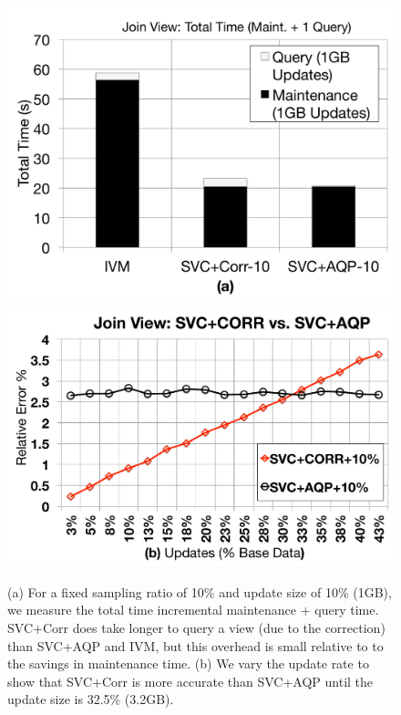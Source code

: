 \begin{figure}[t]
\centering
 \includegraphics[scale=0.13]{exp/msj_4.pdf}
 \includegraphics[scale=0.13]{exp/msj_6.pdf}
  \caption{(a) For a fixed sampling ratio of 10\% and update size of 10\% (1GB), we measure the total time incremental maintenance + query time. SVC+Corr does take longer to query a view (due to the correction) than SVC+AQP and IVM, but this overhead is small relative to to the savings in maintenance time. (b) We vary the update rate to show that SVC+Corr is more accurate than SVC+AQP until the update size is 32.5\% (3.2GB).  \label{exp-1-total}}
\end{figure}


